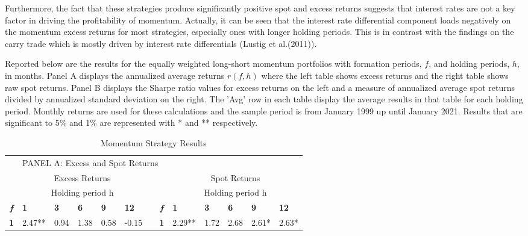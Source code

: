 \documentclass{article}
\begin{document}
Furthermore, the fact that these strategies produce significantly positive spot and excess returns suggests that interest rates are not a key factor in driving the profitability of momentum. Actually, it can be seen that the interest rate differential component loads negatively on the momentum excess returns for most strategies, especially ones with longer holding periods. This is in contrast with the findings on the carry trade which is mostly driven by interest rate differentials (Lustig et al.(2011)).\\



\begin{table}[t!]
  \centering
  \caption{Momentum Strategy Results}
Reported below are the results for the equally weighted long-short momentum portfolios with formation periods, $f$, and holding periods, $h$, in months. Panel A displays the annualized average returns $r(f,h)$ where the left table shows excess returns and the right table shows raw spot returns. Panel B displays the Sharpe ratio values for excess returns on the left and a measure of annualized average spot returns divided by annualized standard deviation on the right. The 'Avg' row in each table display the average results in that table for each holding period. Monthly returns are used for these calculations and the sample period is from January 1999 up until January 2021. Results that are significant to 5\% and 1\% are represented with * and ** respectively.
    \begin{adjustwidth}{-1.3cm}{}
    \begin{tabular}{clllllcclllll}
          &       &       &       &       &       &       &       &       &       &       &       &  \\
    \midrule
          & \multicolumn{12}{l}{PANEL A: Excess and Spot Returns} \\
    \midrule
          & \multicolumn{5}{c}{Excess Returns}    &       &       & \multicolumn{5}{c}{Spot Returns} \\
\cmidrule{2-6}\cmidrule{9-13}          & \multicolumn{5}{c}{Holding period h}  &       &       & \multicolumn{5}{c}{Holding period h} \\
    \textit{\textbf{f}} & \textbf{1} & \textbf{3} & \textbf{6} & \textbf{9} & \textbf{12} &       & \textit{\textbf{f}} & \textbf{1} & \textbf{3} & \textbf{6} & \textbf{9} & \textbf{12} \\
\cmidrule{2-6}\cmidrule{9-13}    \textbf{1} & 2.47** & 0.94  & 1.38  & 0.58  & -0.15 &       & \textbf{1} & 2.29** & 1.72  & 2.68  & 2.61* & 2.63* \\

\end{tabular}
\end{adjustwidth}
\end{table}
\end{document}
